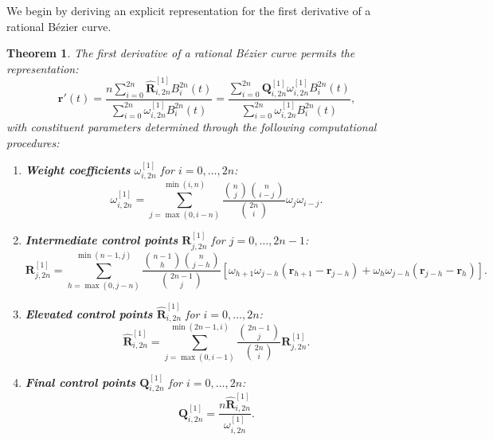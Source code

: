\documentclass[preprint,12pt]{elsarticle}
\newtheorem{Theorem}{Theorem}
\begin{document}
We begin by deriving an explicit representation for the first derivative of a rational Bézier curve.
\begin{Theorem}
\label{thm:derivative_explicit}
The first derivative of a rational Bézier curve permits the representation:
\begin{equation}\label{eq:derivative_rep}
\mathbf{r}'(t) = \frac{n\sum_{i=0}^{2n} \widehat{\mathbf{R}}_{i,2n}^{[1]} B_i^{2n}(t)}{\sum_{i=0}^{2n} \omega_{i,2n}^{[1]} B_i^{2n}(t)} = \frac{\sum_{i=0}^{2n} \mathbf{Q}_{i,2n}^{[1]} \omega_{i,2n}^{[1]} B_i^{2n}(t)}{\sum_{i=0}^{2n} \omega_{i,2n}^{[1]} B_i^{2n}(t)},
\end{equation}
with constituent parameters determined through the following computational procedures:

\begin{enumerate}
\item \textbf{Weight coefficients} $\omega^{[1]}_{i,2n}$ for $i = 0, \ldots, 2n$:
\begin{equation}\label{eq:weight_coeff}
\omega^{[1]}_{i,2n} = \sum_{j=\max(0,i-n)}^{\min(i,n)} \frac{\binom{n}{j}\binom{n}{i-j}}{\binom{2n}{i}} \omega_j \omega_{i-j}.
\end{equation}

\item \textbf{Intermediate control points} $\mathbf{R}^{[1]}_{j,2n}$ for $j = 0, \ldots, 2n-1$:
\begin{equation}\label{eq:intermediate_R}
\mathbf{R}^{[1]}_{j,2n} = \sum_{h=\max(0,j-n)}^{\min(n-1,j)} \frac{\binom{n-1}{h}\binom{n}{j-h}}{\binom{2n-1}{j}} \left[\omega_{h+1}\omega_{j-h}(\mathbf{r}_{h+1} - \mathbf{r}_{j-h}) + \omega_h \omega_{j-h}(\mathbf{r}_{j-h} - \mathbf{r}_h)\right].
\end{equation}

\item \textbf{Elevated control points} $\widehat{\mathbf{R}}^{[1]}_{i,2n}$ for $i = 0, \ldots, 2n$:
\begin{equation}\label{eq:Rhat}
\widehat{\mathbf{R}}^{[1]}_{i,2n} = \sum_{j=\max(0,i-1)}^{\min(2n-1,i)} \frac{\binom{2n-1}{j}}{\binom{2n}{i}} \mathbf{R}^{[1]}_{j,2n}.
\end{equation}

\item \textbf{Final control points} $\mathbf{Q}^{[1]}_{i,2n} $ for $i = 0, \ldots, 2n$:
\begin{equation}\label{eq:final_Q}
\mathbf{Q}^{[1]}_{i,2n} = \frac{n \widehat{\mathbf{R}}^{[1]}_{i,2n}}{\omega^{[1]}_{i,2n}}.
\end{equation}
\end{enumerate}
\end{Theorem}
\end{document}
